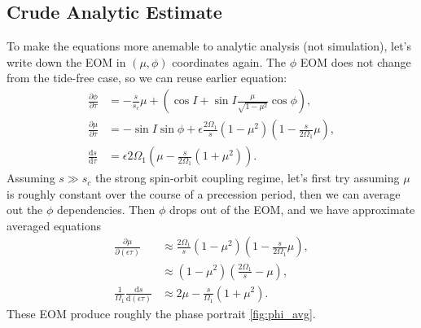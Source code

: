 \documentclass[11pt,
        usenames, %
        dvipsnames %
    ]{article}
\newcommand*{\rd}[2]{\frac{\mathrm{d}#1}{\mathrm{d}#2}}
\newcommand*{\pd}[2]{\frac{\partial#1}{\partial#2}}
\newcommand*{\p}[1]{\left(#1\right)}
\begin{document}
\subsection{Crude Analytic Estimate}

To make the equations more anemable to analytic analysis (not simulation), let's
write down the EOM in $(\mu, \phi)$ coordinates again. The $\phi$ EOM does not
change from the tide-free case, so we can reuse earlier equation:
\begin{align}
    \pd{\phi}{\tau} &= -\frac{s}{s_c}\mu
        + \p{\cos I + \sin I \frac{\mu}{\sqrt{1 - \mu^2}} \cos \phi} ,\\
    \pd{\mu}{\tau} &= -\sin I \sin \phi +
        \epsilon \frac{2\Omega_1}{s}\p{1 - \mu^2}
            \p{1 - \frac{s}{2\Omega_1}\mu},\\
    \rd{s}{\tau}
        &= \epsilon 2\Omega_1 \p{\mu - \frac{s}{2\Omega_1}\p{1 + \mu^2}}.
\end{align}
Assuming $s \gg s_c$ the strong spin-orbit coupling regime, let's first try
assuming $\mu$ is roughly constant over the course of a precession period, then
we can average out the $\phi$ dependencies. Then $\phi$ drops out of the EOM,
and we have approximate averaged equations
\begin{subequations}\label{se:prec_avg}
    \begin{align}
        \pd{\mu}{(\epsilon\tau)} &\approx \frac{2\Omega_1}{s}\p{1 - \mu^2}
                \p{1 - \frac{s}{2\Omega_1}\mu},\nonumber\\
            &\approx \p{1 - \mu^2}
                \p{\frac{2\Omega_1}{s} - \mu},\\
        \frac{1}{\Omega_1}\rd{s}{(\epsilon\tau)}
            &\approx 2\mu - \frac{s}{\Omega_1}\p{1 + \mu^2}.
    \end{align}
\end{subequations}
These EOM produce roughly the phase portrait \autoref{fig:phi_avg}.
\end{document}
